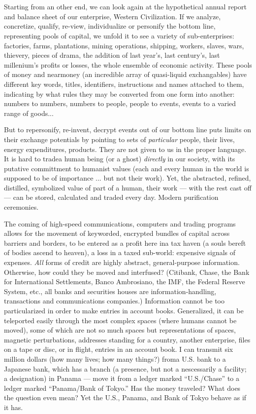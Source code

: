 \chapter{}

Starting from an other end, we can look again at the hypothetical annual report and balance sheet of our enterprise, Western Civilization. If we analyze, concretize, qualify, re-view, individualize or personify the bottom line, representing pools of capital, we unfold it to see a variety of sub-enterprises: factories, farms, plantations, mining operations, shipping, workers, slaves, wars, thievery, pieces of drama, the addition of last year's, last century's, last millenium's profits or losses, the whole ensemble of economic activity. These pools of money and nearmoney (an incredible array of quasi-liquid exchangables) have different key words, titles, identifiers, instructions and names attached to them, indicating by what rules they may be converted from one form into another: numbers to numbers, numbers to people, people to events, events to a varied range of goods...

But to repersonify, re-invent, decrypt events out of our bottom line puts limits on their exchange potentials by pointing to sets of \emph{particular} people, their lives, energy expenditures, products. They are not given to us in the proper language. It is hard to tradea human being (or a ghost) \emph{directly} in our society, with its putative committment to humanist values (each and every human in the world is supposed to be of importance ... but not their work). Yet, the abstracted, refined, distilled, symbolized value of part of a human, their work --- with the rest cast off --- can be stored, calculated and traded every day. Modern purification ceremonies.

The coming of high-speed communications, computers and trading programs allows for the movement of keyworded, encrypted bundles of capital across barriers and borders, to be entered as a profit here ina tax haven (a souls bereft of bodies ascend to heaven), a loss in a taxed sub-world: expensive signals of expenses. \emph{All} forms of credit are highly abstract, general-purpose information. Otherwise, how could they be moved and interfused? (Citibank, Chase, the Bank for International Settlements, Banco Ambrosiano, the IMF, the Federal Reserve System, etc., all banks and securities houses are information-handling, transactions and communications companies.) Information cannot be too particularized in order to make entries in account books. Generalized, it can be teleported easily through the most complex spaces (where humans cannot be moved), some of which are not so much spaces but representations of spaces, magnetic perturbations, addresses standing for a country, another enterprise, files on a tape or disc, or in flight, entries in an account book. I can transmit six million dollars (how many lives; how many things?) froma U.S. bank to a Japanese bank, which has a branch (a presence, but not a nescessarily a facility; a designation) in Panama --- move it from a ledger marked \enquote{U.S.\slash Chase} to a ledger marked \enquote{Panama\slash Bank of Tokyo.} Has the money traveled? What does the question even mean? Yet the U.S., Panama, and Bank of Tokyo behave as if it has.

